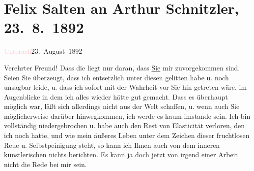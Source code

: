 

\renewcommand{\erwaehntePersonen}{Personen: Richard Beer-Hofmann, Hugo von Hofmannsthal, Felix Salten}
\renewcommand{\erwaehnteOrte}{Orte: Bahnhof, Unterach am Attersee, Wien}
\renewcommand{\erwaehnteWerke}{}
\section[Felix Salten an Arthur Schnitzler, 23. 8. 1892]{Felix Salten an Arthur Schnitzler, 23. 8. 1892}
\nopagebreak{}
\rehead{ }\normalsize\beginnumbering{}
\toendnotes[C]{\smallbreak\pagebreak[2]}
\toendnotes[C]{\smallbreak}
\pstart
           \raggedleft{}{\pb}\textcolor{pink}{Unterach}{}\ledrightnote{\textcolor{pink}{Bahnhof}}{ }23. August 1892\pend
           
\pstart
           Verehrter Freund! Dass die \label{K_L03113-1v}\label{K_L03113-1h} liegt nur daran, dass \uline{Sie} mir zuvorgekommen
               sind. Seien Sie überzeugt, dass ich entsetzlich unter diesen \label{K_L03113-2v}\label{K_L03113-2h} gelitten habe u. noch unsagbar leide, u. dass ich sofort mit der Wahrheit vor
               Sie hin getreten wäre, im Augenblicke in dem ich alles wieder hätte gut gemacht. Dass
               es überhaupt möglich war, läßt sich allerdings nicht aus der Welt schaffen, u. wenn
               auch Sie möglicher{\pb}weise darüber hinwegkommen, ich werde
               es kaum imstande sein. Ich bin vollständig niedergebrochen u. habe auch
               den Rest von Elasticität verloren, den ich noch hatte, und wie mein äußeres
               Leben unter dem Zeichen dieser fruchtlosen
               Reue u. Selbstpeinigung steht, so kann ich Ihnen auch von dem inneren
               künstlerischen nichts berichten. Es kann ja doch jetzt von irgend einer 
               Arbeit nicht die Rede bei mir sein.\pend
           
